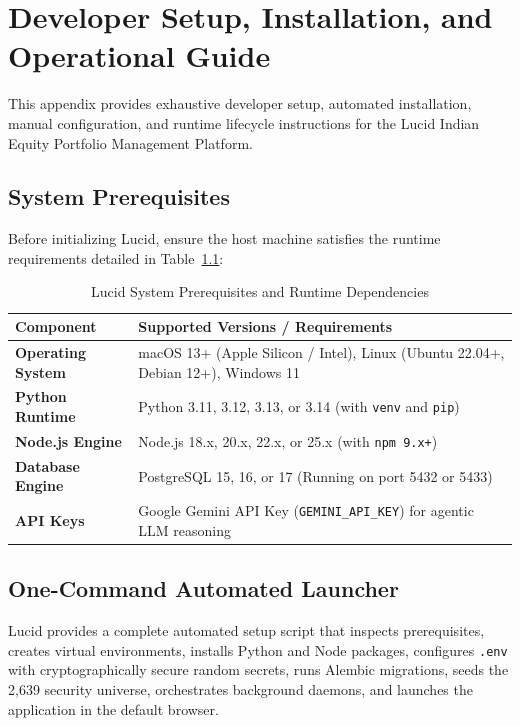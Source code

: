 \chapter{Developer Setup, Installation, and Operational Guide}
\label{app:installation_guide}

This appendix provides exhaustive developer setup, automated installation, manual configuration, and runtime lifecycle instructions for the Lucid Indian Equity Portfolio Management Platform.

\section{System Prerequisites}
Before initializing Lucid, ensure the host machine satisfies the runtime requirements detailed in Table~\ref{tab:app_prereqs}:

\begin{table}[H]
\centering
\caption{Lucid System Prerequisites and Runtime Dependencies}
\label{tab:app_prereqs}
\begin{tabular}{ll}
\toprule
\textbf{Component} & \textbf{Supported Versions / Requirements} \\
\midrule
\textbf{Operating System} & macOS 13+ (Apple Silicon / Intel), Linux (Ubuntu 22.04+, Debian 12+), Windows 11 \\
\textbf{Python Runtime} & Python 3.11, 3.12, 3.13, or 3.14 (with \texttt{venv} and \texttt{pip}) \\
\textbf{Node.js Engine} & Node.js 18.x, 20.x, 22.x, or 25.x (with \texttt{npm 9.x+}) \\
\textbf{Database Engine} & PostgreSQL 15, 16, or 17 (Running on port 5432 or 5433) \\
\textbf{API Keys} & Google Gemini API Key (\texttt{GEMINI\_API\_KEY}) for agentic LLM reasoning \\
\bottomrule
\end{tabular}
\end{table}

\section{One-Command Automated Launcher}
Lucid provides a complete automated setup script that inspects prerequisites, creates virtual environments, installs Python and Node packages, configures \texttt{.env} with cryptographically secure random secrets, runs Alembic migrations, seeds the 2,639 security universe, orchestrates background daemons, and launches the application in the default browser.

